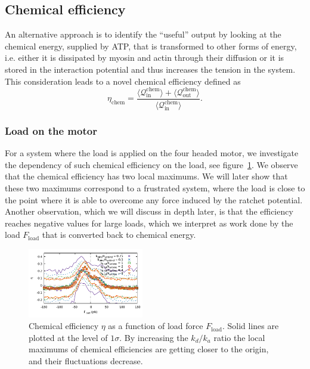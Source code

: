 \documentclass[aps,pre,twocolumn,showpacs,showkeys,superscriptaddress,floatfix]{revtex4-1}
\begin{document}
\subsection{Chemical efficiency} %
\label{sec:chemical_efficiency}
An alternative approach is to identify the ``useful'' output by looking at the chemical energy, supplied by ATP, that is transformed to other forms of energy, 
i.e. either it is dissipated by myosin and actin through their diffusion or it is stored in the interaction potential and thus increases the tension in the system. 
This consideration leads to a novel chemical efficiency defined as 
\begin{equation}
\eta_\text{chem} = \frac{\langle\mathcal Q^\text{chem}_\text{in}\rangle+\langle\mathcal Q^\text{chem}_\text{out}\rangle}{\langle\mathcal Q^\text{chem}_\text{in}\rangle} .
\label{eq:efficiency}
\end{equation}

\subsubsection{Load on the motor}
For a system where the load is applied on the four headed motor, we investigate the dependency of such chemical efficiency on the load, see figure~\ref{fig:chem}.
We observe that the chemical efficiency has two local maximums. 
We will later show that these two maximums correspond to a frustrated system, 
where the load is close to the point where it is able to overcome any force induced by the ratchet potential. 
Another observation, which we will discuss in depth later, is that the efficiency reaches negative values for large loads, 
which we interpret as work done by the load $F_\text{load}$ that is converted back to chemical energy. 
\begin{figure}[t]
\centering
\includegraphics[width=0.45\textwidth,height=!]{chemical_cycle}
\caption{
\label{fig:chem}
Chemical efficiency $\eta$ as a function of load force $F_\text{load}$.
Solid lines are plotted at the level of $1\sigma$. 
By increasing the $k_d/k_a$ ratio the local maximums of chemical efficiencies are getting closer to the origin,
and their fluctuations decrease. 
}
\end{figure}
\end{document}
